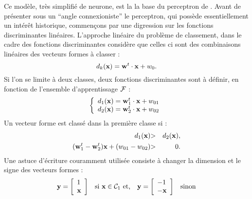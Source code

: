 Ce mod\`ele, tr\`es simplifi\'e de neurone, est la la base du perceptron
de . Avant de pr\'esenter sous un ``angle
connexioniste'' le perceptron,
qui poss\`ede essentiellement un int\'er\^et historique,  commen\c{c}ons 
par une digression sur les fonctions discriminantes lin\'eaires. L'approche
lin\'eaire du probl\`eme de classement, dans le cadre des fonctions discriminantes
consid\`ere que celles ci  sont des combinaisons lin\'eaires
des vecteurs formes \`a classer :
$$
d_k(\x)= \bw^t \cdot \x + w_0.
$$ 
Si l'on se limite \`a deux classes, deux fonctions discriminantes 
sont \`a d\'efinir, en fonction de l'ensemble d'apprentissage ${\cal F}$ :
$$
\left \{ \begin{array}{l}
d_1(\x)= \bw_1^t \cdot \x + w_{01} \\
d_2(\x)= \bw_2^t \cdot \x + w_{02} \\
\end{array}
\right .
$$
Un vecteur forme est class\'e dans la premi\`ere classe si :
\begin{eqnarray*}
d_1(\mbox{\bf x}) & {>} &  d_2(\mbox{\bf x}),\\
(\mbox{\bf w}_1^t-\mbox{\bf w}_2^t)\mbox{\bf x} +(w_{01}-w_{02}) & {>} & 0.
\end{eqnarray*}
Une astuce d'\'ecriture couramment utilis\'ee consiste \`a changer la 
dimension et le signe des vecteurs formes :
$$
\begin{array}{l c l c}

\y = \left [ 
\begin{array}{l}
1\\
\x\\
\end{array}
\right ]

&

\mbox{si $\x \in {\cal C}_1$ et,}

&
\y = \left [ 
\begin{array}{l}
-1\\
-\x\\
\end{array}
\right ]

&
\mbox{sinon}

\end{array}
$$

